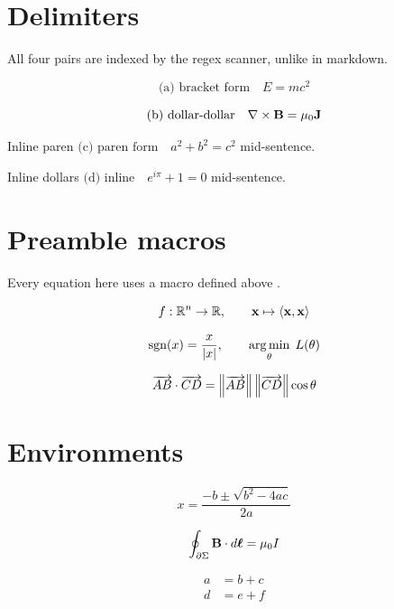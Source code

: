 \section{Delimiters}

All four pairs are indexed by the regex scanner, unlike in markdown.

\[
  \text{(a) bracket form} \quad E = mc^2
\]

$$
\text{(b) dollar-dollar} \quad \nabla \times \mathbf{B} = \mu_0 \mathbf{J}
$$

Inline paren \( \text{(c) paren form} \quad a^2 + b^2 = c^2 \) mid-sentence.

Inline dollars $\text{(d) inline} \quad e^{i\pi} + 1 = 0$ mid-sentence.

\section{Preamble macros}

Every equation here uses a macro defined above \verb||.

\begin{equation}
  f : \mathbb{R}^n \to \mathbb{R}, \qquad \mathbf{x} \mapsto \langle \mathbf{x}, \mathbf{x} \rangle
\end{equation}

\begin{equation}
  \operatorname{sgn}(x) = \frac{x}{\abs{x}}, \qquad \operatorname*{arg\,min}_{\theta} \; L(\theta)
\end{equation}

\begin{equation}
  \overrightarrow{AB} \cdot \overrightarrow{CD} = \norm{\overrightarrow{AB}} \, \norm{\overrightarrow{CD}} \cos\theta
\end{equation}

\section{Environments}

\begin{equation}
  x = \frac{-b \pm \sqrt{b^2 - 4ac}}{2a}
\end{equation}

\begin{equation*}
  \oint_{\partial \Sigma} \mathbf{B} \cdot d\boldsymbol{\ell} = \mu_0 I
\end{equation*}

\begin{align}
  a &= b + c \\
  d &= e + f
\end{align}

